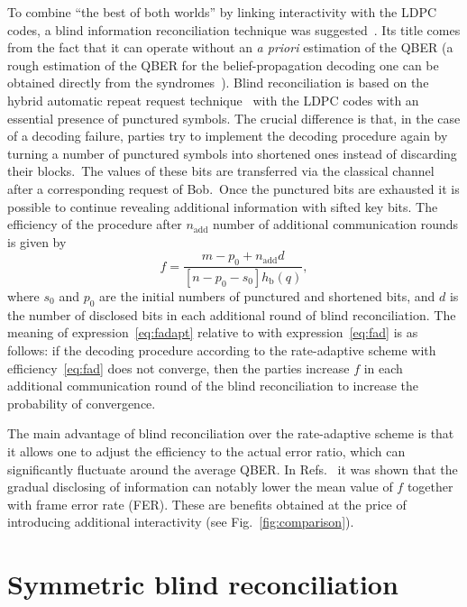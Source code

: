 \documentclass[aps,pra,twocolumn,amsmath,amssymb,nofootinbib,showpacs,superscriptaddress]{revtex4-1}
\newcommand{\hb}{h_\mathrm{b}}
\begin{document}
To combine ``the best of both worlds'' by linking interactivity with the LDPC codes, a blind information reconciliation technique was suggested~\cite{LDPC4_adapt1,LDPC5_blind,LDPC6_blindrep}.
Its title comes from the fact that it can operate without an \emph{a priori} estimation of the QBER 
(a rough estimation of the QBER for the belief-propagation decoding one can be obtained directly from the syndromes~\cite{Estimating}).  
Blind reconciliation is based on the hybrid automatic repeat request technique~\cite{HARQ} with the LDPC codes with an essential presence of punctured symbols.
The crucial difference is that, in the case of a decoding failure, parties try to implement the decoding procedure again by turning a number of punctured symbols into shortened ones instead of discarding their blocks.~The values of these bits are transferred via the classical channel after a corresponding request of Bob.~Once the punctured bits are exhausted it is possible to continue revealing additional information with sifted key bits.
The efficiency of the procedure after $n_\mathrm{add}$ number of additional communication rounds is given by~\cite{LDPC5_blind}
\begin{equation}\label{eq:fadapt}
	f = \frac{m-p_0+n_\mathrm{add}d}{\left[n-p_0-s_0\right]\hb(q)},
\end{equation}
where $s_0$ and $p_0$ are the initial numbers of punctured and shortened bits, and $d$ is the number of disclosed bits in each additional round of blind reconciliation.
The meaning of expression~\eqref{eq:fadapt} relative to with expression~\eqref{eq:fad} is as follows: if the decoding procedure according to the rate-adaptive scheme with efficiency~\eqref{eq:fad} does not converge, 
then the parties increase $f$ in each additional communication round of the blind reconciliation to increase the probability of convergence.

The main advantage of blind reconciliation over the rate-adaptive scheme is that it allows one to adjust the efficiency to the actual error ratio, 
which can significantly fluctuate around the average QBER.
In Refs.~\cite{LDPC5_blind,LDPC6_blindrep} it was shown that the gradual disclosing of information can notably lower the mean value of $f$ together with frame error rate (FER).
These are benefits obtained at the price of introducing additional interactivity (see Fig.~\ref{fig:comparison}).

\section{Symmetric blind reconciliation}\label{sec:blind}
\end{document}
